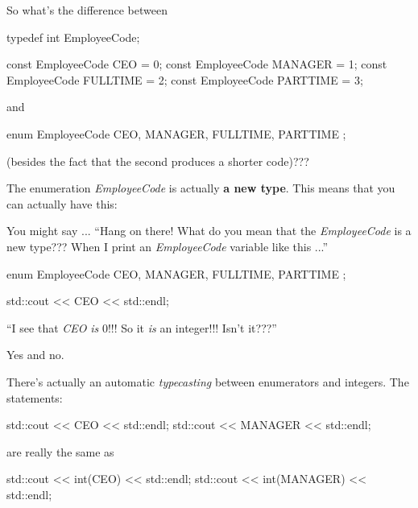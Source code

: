 \newpage{}

So what's the difference between

\begin{consolethree}[escapeinside=||]
typedef int EmployeeCode;

const EmployeeCode CEO = 0;
const EmployeeCode MANAGER = 1;
const EmployeeCode FULLTIME = 2;
const EmployeeCode PARTTIME = 3;
\end{consolethree}

and

\begin{consolethree}[escapeinside=||]
enum EmployeeCode
{
    CEO, MANAGER, FULLTIME, PARTTIME
};
\end{consolethree}

(besides the fact that the second produces a shorter code)???

The enumeration \textit{EmployeeCode} is actually \textbf{a new
type}. This means that you can actually have this:



\newpage{}

You might say ... ``Hang on there! What do you mean that the
\textit{EmployeeCode} is a new type??? When I print an \textit{EmployeeCode}
variable like this ...''

\begin{consolethree}[escapeinside=||]
enum EmployeeCode
{
    CEO, MANAGER, FULLTIME, PARTTIME
};

std::cout << CEO << std::endl;
\end{consolethree}

``I see that \textit{CEO} \textit{is} 0!!! So it \textit{is} an integer!!!
Isn't it???''

Yes and no.

There's actually an automatic \textit{typecasting} between
enumerators and integers. The statements:

\begin{consolethree}[escapeinside=||]
std::cout << CEO << std::endl;
std::cout << MANAGER << std::endl;
\end{consolethree}

are really the same as

\begin{consolethree}[escapeinside=||]
std::cout << int(CEO) << std::endl;
std::cout << int(MANAGER) << std::endl;
\end{consolethree}

